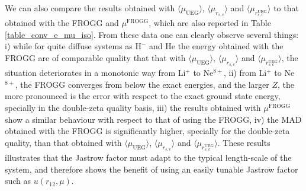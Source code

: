 \documentclass[aip,jcp,reprint,noshowkeys,superscriptaddress]{revtex4-1}
\newcommand{\mfrogg}[0]{\mu^\text{FROGG}}
\newcommand{\muuegav}{\langle \mu_{\text{UEG}}\rangle}
\newcommand{\murscav}{\langle \mu_{r_{s,c}}\rangle}
\newcommand{\mursclda}{\langle \mu_{r_{s,c}^{\text{UEG}}}\rangle}
\begin{document}
We can also compare the results obtained with $\muuegav$, $\murscav$ and $\mursclda$ to that obtained with the FROGG and $\mfrogg$, which are also reported in Table \ref{table_conv_e_mu_iso}. 
From these data one can clearly observe several things: i) while for quite diffuse systems as H$^-$ and He the energy obtained with the FROGG are of comparable quality that that with $\muuegav$, $\murscav$ and $\mursclda$, the situation deteriorates in a monotonic way from Li$^+$ to Ne$^{8+}$, ii) from Li$^+$ to Ne$^{8+}$, the FROGG converges from below the exact energies, and the larger $Z$, the more pronounced is the error with respect to the exact ground state energy, specially in the double-zeta quality basis, iii) the results obtained with $\mfrogg$ show a similar behaviour with respect to that of using the FROGG, iv) the MAD obtained with the FROGG is significantly higher, specially for the double-zeta quality, than that obtained with $\muuegav$, $\murscav$ and $\mursclda$. 
These results illustrates that the Jastrow factor must adapt to the typical length-scale of the system, and therefore shows the benefit of using an easily tunable Jastrow factor such as $u(r_{12},\mu)$. 
\end{document}
